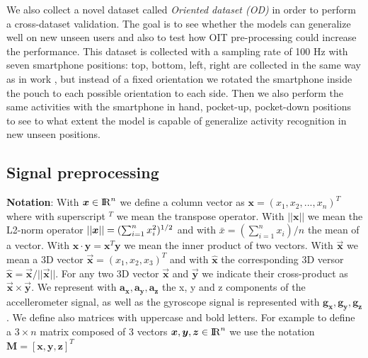 We also collect a novel dataset called \textit{Oriented dataset (OD)} in order to perform a cross-dataset validation. The goal is to see whether the models can generalize well on new unseen users and also to test how OIT pre-processing could increase the performance. This dataset is collected with a sampling rate of 100 Hz with seven smartphone positions: top, bottom, left, right are collected in the same way as in work \cite{blunck2013heterogeneity}, but instead of a fixed orientation we rotated the smartphone inside the pouch to each possible orientation to each side. Then we also perform the same activities with the smartphone in hand, pocket-up, pocket-down positions to see to what extent the model is capable of generalize activity recognition in new unseen positions.

\subsection{Signal preprocessing}

\textbf{Notation}: With $\boldsymbol{x} \in {\rm I\!R}^{n}$ we define a column vector as $\boldsymbol{x}=(x_{1}, x_{2}, ..., x_{n})^{T}$ where with superscript $^T$ we mean the transpose operator. With $\boldsymbol{||x||}$ we mean the L2-norm operator $||\boldsymbol{x}|| = (\sum_{i=1}^{n} x_{i}^{2})^{1/2}$ and with $\bar{x} = (\sum_{i=1}^{n} x_{i}) / n$ the mean of a vector. With $\boldsymbol{x} \cdot \boldsymbol{y} =\boldsymbol{x}^{T}\boldsymbol{y} $ we mean the inner product of two vectors. With $\boldsymbol{\vec{x}}$ we mean a 3D vector $\boldsymbol{\vec{x}} = (x_{1}, x_{2}, x_{3})^{T}$ and with $\boldsymbol{\hat{x}}$ the corresponding 3D versor $\boldsymbol{\hat{x}}=\boldsymbol{\vec{x}}/ ||\boldsymbol{\vec{x}}||$. For any two 3D vector $\boldsymbol{\vec{x}}$ and $\boldsymbol{\vec{y}}$ we indicate their cross-product as $\boldsymbol{\vec{x}} \times \boldsymbol{\vec{y}}$. We represent with $\boldsymbol{a_{x}}, \boldsymbol{a_{y}}, \boldsymbol{a_{z}}$ the x, y and z components of the accellerometer signal, as well as the gyroscope signal is represented with $\boldsymbol{g_{x}}, \boldsymbol{g_{y}}, \boldsymbol{g_{z}}$. We define also matrices with uppercase and bold letters. For example to define a $3 \times n$ matrix composed of 3 vectors \mbox{$\boldsymbol{x}, \boldsymbol{y}, \boldsymbol{z} \in {\rm I\!R}^{n}$} we use the notation \mbox{$\boldsymbol{M} = [\boldsymbol{x}, \boldsymbol{y}, \boldsymbol{z}]^{T}$}\\


